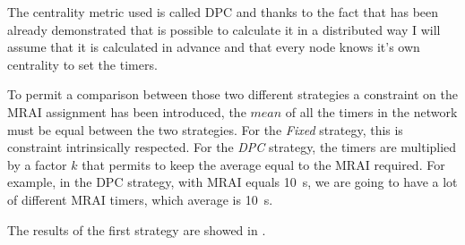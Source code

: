 The centrality metric used is called \ac{DPC} and thanks to the fact that has been
already demonstrated that is possible to calculate it in a distributed way \cite{milani2019BGP} I will
assume that it is calculated in advance and that every node knows it's own centrality to
set the timers.

To permit a comparison between those two different strategies a constraint on the
\ac{MRAI} assignment has been introduced, the $mean$ of all the timers in the network
must be equal between the two strategies.
For the \textit{Fixed} strategy, this is constraint intrinsically respected.
For the \textit{DPC} strategy, the timers are multiplied by a factor $k$ that
permits to keep the average equal to the \ac{MRAI} required.
For example, in the \ac{DPC} strategy, with \ac{MRAI} equals \SI{10}{\second},
we are going to have a lot of different \ac{MRAI} timers, which average is \SI{10}{\second}.

The results of the first strategy are showed in .

